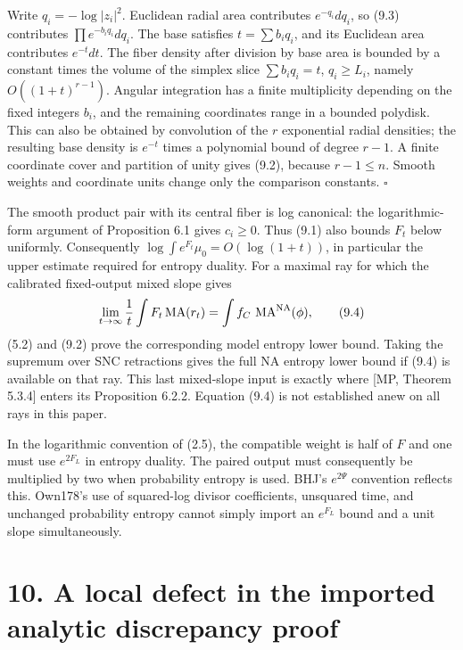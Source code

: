 \documentclass[
  11pt,
]{article}
\begin{document}
Write \(q_i=-\log|z_i|^2\). Euclidean radial area contributes
\(e^{-q_i}dq_i\), so (9.3) contributes \(\prod e^{-b_iq_i}dq_i\). The
base satisfies \(t=\sum b_iq_i\), and its Euclidean area contributes
\(e^{-t}dt\). The fiber density after division by base area is bounded
by a constant times the volume of the simplex slice \(\sum b_iq_i=t\),
\(q_i\geq L_i\), namely \(O((1+t)^{r-1})\). Angular integration has a
finite multiplicity depending on the fixed integers \(b_i\), and the
remaining coordinates range in a bounded polydisk. This can also be
obtained by convolution of the \(r\) exponential radial densities; the
resulting base density is \(e^{-t}\) times a polynomial bound of degree
\(r-1\). A finite coordinate cover and partition of unity gives (9.2),
because \(r-1\leq n\). Smooth weights and coordinate units change only
the comparison constants. \(\square\)

The smooth product pair with its central fiber is log canonical: the
logarithmic-form argument of Proposition 6.1 gives \(c_i\geq0\). Thus
(9.1) also bounds \(F_t\) below uniformly. Consequently
\(\log\int e^{F_t}\mu_0=O(\log(1+t))\), in particular the upper estimate
required for entropy duality. For a maximal ray for which the calibrated
fixed-output mixed slope gives \[
 \lim_{t\to\infty}\frac1t\int F_t\operatorname{MA}(r_t)
       =\int f_C\,\operatorname{MA}^{\rm NA}(\phi),          \tag{9.4}
\] (5.2) and (9.2) prove the corresponding model entropy lower bound.
Taking the supremum over SNC retractions gives the full NA entropy lower
bound if (9.4) is available on that ray. This last mixed-slope input is
exactly where {[}MP, Theorem 5.3.4{]} enters its Proposition 6.2.2.
Equation (9.4) is not established anew on all rays in this paper.

In the logarithmic convention of (2.5), the compatible weight is half of
\(F\) and one must use \(e^{2F_L}\) in entropy duality. The paired
output must consequently be multiplied by two when probability entropy
is used. BHJ's \(e^{2\Psi}\) convention reflects this. Own178's use of
squared-log divisor coefficients, unsquared time, and unchanged
probability entropy cannot simply import an \(e^{F_L}\) bound and a unit
slope simultaneously.

\section{10. A local defect in the imported analytic discrepancy
proof}\label{a-local-defect-in-the-imported-analytic-discrepancy-proof}
\end{document}
